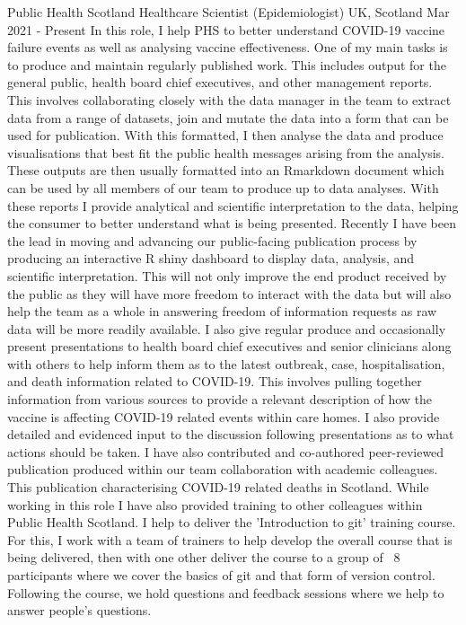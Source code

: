  \cventry
{Public Health Scotland} %
{Healthcare Scientist (Epidemiologist)} %
{UK, Scotland} %
{Mar 2021 - Present} %
{
In this role, I help PHS to better understand COVID-19 vaccine failure events as well as analysing vaccine effectiveness.\newline
One of my main tasks is to produce and maintain regularly published work. This includes output for the general public, health board chief executives, and other management reports. This involves collaborating closely with the data manager in the team to extract data from a range of datasets, join and mutate the data into a form that can be used for publication. With this formatted, I then analyse the data and produce visualisations that best fit the public health messages arising from the analysis. These outputs are then usually formatted into an Rmarkdown document which can be used by all members of our team to produce up to data analyses. With these reports I provide analytical and scientific interpretation to the data, helping the consumer to better understand what is being presented.\newline
Recently I have been the lead in moving and advancing our public-facing publication process by producing an interactive R shiny dashboard to display data, analysis, and scientific interpretation. This will not only improve the end product received by the public as they will have more freedom to interact with the data but will also help the team as a whole in answering freedom of information requests as raw data will be more readily available.\newline
I also give regular produce and occasionally present presentations to health board chief executives and senior clinicians along with others to help inform them as to the latest outbreak, case, hospitalisation, and death information related to COVID-19. This involves pulling together information from various sources to provide a relevant description of how the vaccine is affecting COVID-19 related events within care homes. I also provide detailed and evidenced input to the discussion following presentations as to what actions should be taken.\newline
I have also contributed and co-authored peer-reviewed publication produced within our team collaboration with academic colleagues. This publication characterising COVID-19 related deaths in Scotland.\newline
While working in this role I have also provided training to other colleagues within Public Health Scotland. I help to deliver the 'Introduction to git' training course. For this, I work with a team of trainers to help develop the overall course that is being delivered, then with one other deliver the course to a group of ~8 participants where we cover the basics of git and that form of version control. Following the course, we hold questions and feedback sessions where we help to answer people's questions.\newline
}
